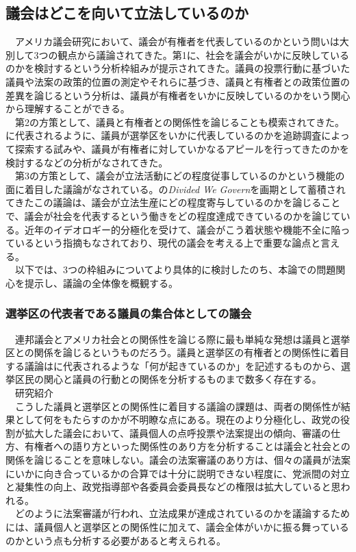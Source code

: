 \subsection{議会はどこを向いて立法しているのか}
　アメリカ議会研究において、議会が有権者を代表しているのかという問いは大別して3つの観点から議論されてきた。第1に、社会を議会がいかに反映しているのかを検討するという分析枠組みが提示されてきた。議員の投票行動に基づいた議員や法案の政策的位置の測定\citep*{Poole2017-ir,Caughey2016-ef}やそれらに基づき、議員と有権者との政策位置の差異を論じるという分析\citep*{Hall2015-kc,Hall2019-oe}は、議員が有権者をいかに反映しているのかをいう関心から理解することができる。\\
　第2の方策として、議員と有権者との関係性を論じることも模索されてきた。\citet*{Fenno1977-se,Fenno2000-up}に代表されるように、議員が選挙区をいかに代表しているのかを追跡調査によって探索する試みや、議員が有権者に対していかなるアピールを行ってきたのかを検討するなどの分析がなされてきた。\\
　第3の方策として、議会が立法活動にどの程度従事しているのかという機能の面に着目した議論がなされている。\citet*{Mayhew1991-rq,Mayhew2005-or}の\textit{Divided We Govern}を画期として蓄積されてきたこの議論は、議会が立法生産にどの程度寄与しているのかを論じることで、議会が社会を代表するという働きをどの程度達成できているのかを論じている。近年のイデオロギー的分極化を受けて、議会がこう着状態や機能不全に陥っているという指摘もなされており、現代の議会を考える上で重要な論点と言える。\\
　以下では、3つの枠組みについてより具体的に検討したのち、本論での問題関心を提示し、議論の全体像を概観する。\\

\subsubsection{選挙区の代表者である議員の集合体としての議会}
　連邦議会とアメリカ社会との関係性を論じる際に最も単純な発想は議員と選挙区との関係を論じるというものだろう。議員と選挙区の有権者との関係性に着目する議論は\citet*{Fenno2000-up}に代表されるような「何が起きているのか」を記述するものから、選挙区民の関心と議員の行動との関係を分析するものまで数多く存在する。\\
　研究紹介\\
　こうした議員と選挙区との関係性に着目する議論の課題は、両者の関係性が結果として何をもたらすのかが不明瞭な点にある。現在のより分極化し、政党の役割が拡大した議会において、議員個人の点呼投票や法案提出の傾向、審議の仕方、有権者への語り方といった関係性のあり方を分析することは議会と社会との関係を論じることを意味しない。議会の法案審議のあり方は、個々の議員が法案にいかに向き合っているかの合算では十分に説明できない程度に、党派間の対立と凝集性の向上、政党指導部や各委員会委員長などの権限は拡大していると思われる。\\
　どのように法案審議が行われ、立法成果が達成されているのかを議論するためには、議員個人と選挙区との関係性に加えて、議会全体がいかに振る舞っているのかという点も分析する必要があると考えられる。\\

